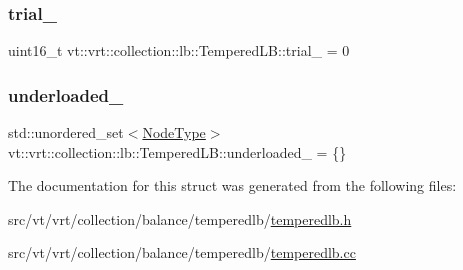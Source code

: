 \subsubsection{\texorpdfstring{trial\+\_\+}{trial\_}}
{\footnotesize\ttfamily uint16\+\_\+t vt\+::vrt\+::collection\+::lb\+::\+Tempered\+L\+B\+::trial\+\_\+ = 0\hspace{0.3cm}{\ttfamily [private]}}

\mbox{\label{structvt_1_1vrt_1_1collection_1_1lb_1_1_tempered_l_b_a1fecccd06fbeae5e5632998140a3b3b7}} 
\subsubsection{\texorpdfstring{underloaded\+\_\+}{underloaded\_}}
{\footnotesize\ttfamily std\+::unordered\+\_\+set$<$\hyperlink{namespacevt_a866da9d0efc19c0a1ce79e9e492f47e2}{Node\+Type}$>$ vt\+::vrt\+::collection\+::lb\+::\+Tempered\+L\+B\+::underloaded\+\_\+ = \{\}\hspace{0.3cm}{\ttfamily [private]}}



The documentation for this struct was generated from the following files\+:\begin{DoxyCompactItemize}
\item 
src/vt/vrt/collection/balance/temperedlb/\hyperlink{temperedlb_8h}{temperedlb.\+h}\item 
src/vt/vrt/collection/balance/temperedlb/\hyperlink{temperedlb_8cc}{temperedlb.\+cc}\end{DoxyCompactItemize}
